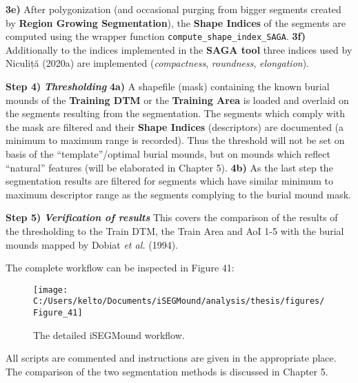 \documentclass[
  12pt,
]{article}
\begin{document}
\newline
\textbf{3e)} After polygonization (and occasional purging from bigger segments created by \textbf{Region Growing Segmentation}), the \textbf{Shape Indices} of the segments are computed using the wrapper function \texttt{compute\_shape\_index\_SAGA}.
\newline
\textbf{3f)} Additionally to the indices implemented in the \textbf{SAGA tool} three indices used by Niculiță (2020a) are implemented (\emph{compactness}, \emph{roundness}, \emph{elongation}).

\textbf{Step 4)} \textbf{\emph{Thresholding}}
\newline
\textbf{4a)} A shapefile (mask) containing the known burial mounds of the \textbf{Training DTM} or the \textbf{Training Area} is loaded and overlaid on the segments resulting from the segmentation. The segments which comply with the mask are filtered and their \textbf{Shape Indices} (descriptors) are documented (a minimum to maximum range is recorded). Thus the threshold will not be set on basis of the ``template''/optimal burial mounds, but on mounds which reflect ``natural'' features (will be elaborated in Chapter 5).
\newline
\textbf{4b)} As the last step the segmentation results are filtered for segments which have similar minimum to maximum descriptor range as the segments complying to the burial mound mask.

\textbf{Step 5)} \textbf{\emph{Verification of results}}
\newline
This covers the comparison of the results of the thresholding to the Train DTM, the Train Area and AoI 1-5 with the burial mounds mapped by Dobiat \emph{et al.} (1994).

The complete workflow can be inspected in Figure 41:

\begin{figure}

{\centering \texttt{[image: C:/Users/kelto/Documents/iSEGMound/analysis/thesis/figures/Figure\_41]} 

}

\caption{The detailed iSEGMound workflow.}\label{fig:Figure41}
\end{figure}

All scripts are commented and instructions are given in the appropriate place. The comparison of the two segmentation methods is discussed in Chapter 5.

\newpage
\end{document}
